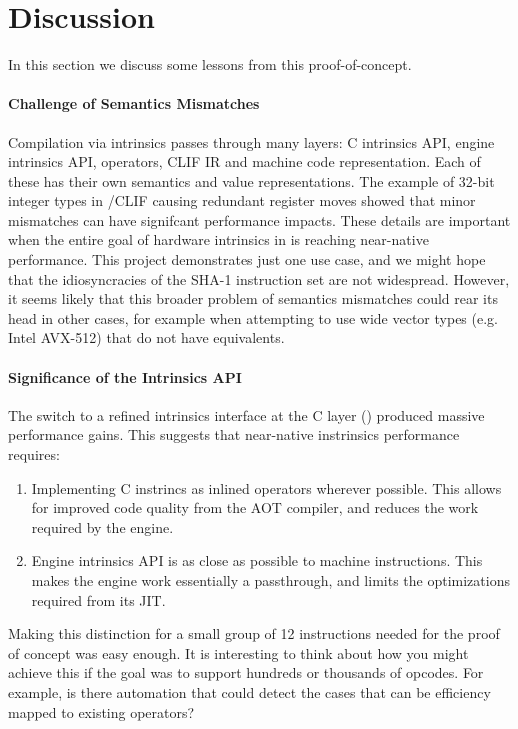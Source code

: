 \section{Discussion}

In this section we discuss some lessons from this proof-of-concept.

\paragraph{Challenge of Semantics Mismatches}

Compilation via intrinsics passes through many layers: C intrinsics API, engine
intrinsics API, \wasm operators, CLIF IR and machine code representation. Each
of these has their own semantics and value representations.  The example of
32-bit integer types in \wasm/CLIF causing redundant register moves showed that
minor mismatches can have signifcant performance impacts. These details are
important when the entire goal of hardware intrinsics in \wasm is reaching
near-native performance. This project demonstrates just one use case, and we
might hope that the idiosyncracies of the SHA-1 instruction set are not
widespread. However, it seems likely that this broader problem of semantics
mismatches could rear its head in other cases, for example when attempting to
use wide vector types (e.g. Intel AVX-512) that do not have \wasm equivalents.

\paragraph{Significance of the Intrinsics API}

The switch to a refined intrinsics interface at the C layer ()
produced massive performance gains. This suggests that near-native
instrinsics performance requires:
%
\begin{enumerate}
    \item Implementing C instrincs as inlined \wasm operators wherever possible.
    This allows for improved code quality from the AOT compiler, and reduces the
    work required by the engine.
    \item Engine intrinsics API is as close as possible to machine instructions.
    This makes the engine work essentially a passthrough, and limits the
    optimizations required from its JIT.
\end{enumerate}

Making this distinction for a small group of 12 instructions needed for the
proof of concept was easy enough.  It is interesting to think about how you
might achieve this if the goal was to support hundreds or thousands of opcodes.
For example, is there automation that could detect the cases that can be
efficiency mapped to existing \wasm operators?

